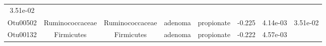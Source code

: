 \documentclass[11pt,]{article}
\begin{document}
\begin{longtable}[]{@{}cccccccc@{}}
\begin{minipage}[t]{0.08\columnwidth}
3.51e-02\strut
\end{minipage}\tabularnewline
\begin{minipage}[t]{0.08\columnwidth}\centering\strut
Otu00502\strut
\end{minipage} & \begin{minipage}[t]{0.15\columnwidth}\centering\strut
Ruminococcaceae\strut
\end{minipage} & \begin{minipage}[t]{0.15\columnwidth}\centering\strut
Ruminococcaceae\strut
\end{minipage} & \begin{minipage}[t]{0.08\columnwidth}\centering\strut
adenoma\strut
\end{minipage} & \begin{minipage}[t]{0.09\columnwidth}\centering\strut
propionate\strut
\end{minipage} & \begin{minipage}[t]{0.07\columnwidth}\centering\strut
-0.225\strut
\end{minipage} & \begin{minipage}[t]{0.08\columnwidth}\centering\strut
4.14e-03\strut
\end{minipage} & \begin{minipage}[t]{0.08\columnwidth}\centering\strut
3.51e-02\strut
\end{minipage}\tabularnewline
\begin{minipage}[t]{0.08\columnwidth}\centering\strut
Otu00132\strut
\end{minipage} & \begin{minipage}[t]{0.15\columnwidth}\centering\strut
Firmicutes\strut
\end{minipage} & \begin{minipage}[t]{0.15\columnwidth}\centering\strut
Firmicutes\strut
\end{minipage} & \begin{minipage}[t]{0.08\columnwidth}\centering\strut
adenoma\strut
\end{minipage} & \begin{minipage}[t]{0.09\columnwidth}\centering\strut
propionate\strut
\end{minipage} & \begin{minipage}[t]{0.07\columnwidth}\centering\strut
-0.222\strut
\end{minipage} & \begin{minipage}[t]{0.08\columnwidth}\centering\strut
4.57e-03\strut
\end{minipage} & \begin{minipage}[t]{0.08\columnwidth}\centering\strut

\end{minipage}
\end{longtable}
\end{document}
